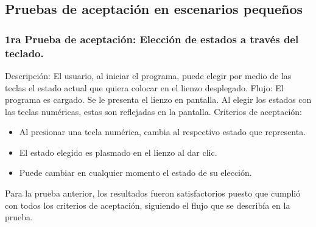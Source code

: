 \subsection{Pruebas de aceptaci\'on en escenarios peque\~nos}
\subsubsection{1ra Prueba de aceptaci\'on: Elecci\'on de estados a trav\'es del teclado.}
    Descripci\'on: El usuario, al iniciar el programa, puede elegir
        por medio de las teclas el estado actual que quiera colocar en
        el lienzo desplegado.
    \vskip 0.5cm
    Flujo:
        El programa es cargado.
        \vskip 0.5cm
        Se le presenta el lienzo en pantalla.
        \vskip 0.5cm
        Al elegir los estados con las teclas num\'ericas, estas son
        reflejadas en la pantalla.
        \vskip 0.5cm
        Criterios de aceptaci\'on:
        \begin{itemize}
            \item Al presionar una tecla num\'erica, cambia al
                respectivo estado que representa.
            \item El estado elegido es plasmado en el lienzo al dar clic. 
            \item Puede cambiar en cualquier momento el estado de su elecci\'on.
        \end{itemize}
    \vskip 0.5cm
        Para la prueba anterior, los resultados fueron satisfactorios
        puesto que cumpli\'o con todos los criterios de aceptaci\'on,
        siguiendo el flujo que se describ\'ia en la prueba.
